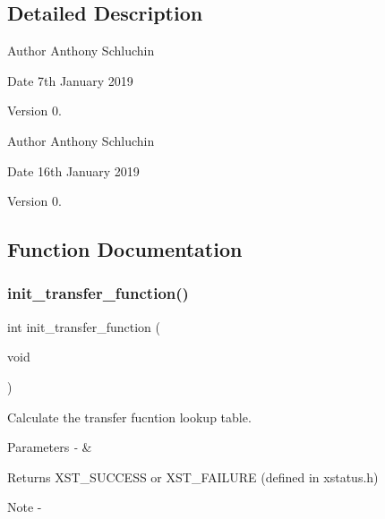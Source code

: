\subsection{Detailed Description}
\begin{DoxyAuthor}{Author}
Anthony Schluchin 
\end{DoxyAuthor}
\begin{DoxyDate}{Date}
7th January 2019 
\end{DoxyDate}
\begin{DoxyVersion}{Version}
0.
\end{DoxyVersion}
\begin{DoxyAuthor}{Author}
Anthony Schluchin 
\end{DoxyAuthor}
\begin{DoxyDate}{Date}
16th January 2019 
\end{DoxyDate}
\begin{DoxyVersion}{Version}
0. 
\end{DoxyVersion}


\subsection{Function Documentation}
\mbox{\label{transfer__function_8h_ab0763112842c0400c0bc611fb9b8bca8}} 
\subsubsection{init\_transfer\_function()}
{\footnotesize\ttfamily int init\+\_\+transfer\+\_\+function (\begin{DoxyParamCaption}\item[{void}]{ }\end{DoxyParamCaption})}



Calculate the transfer fucntion lookup table. 


\begin{DoxyParams}{Parameters}
{\em -\/} & \\
\hline
\end{DoxyParams}
\begin{DoxyReturn}{Returns}
X\+S\+T\+\_\+\+S\+U\+C\+C\+E\+SS or X\+S\+T\+\_\+\+F\+A\+I\+L\+U\+RE (defined in xstatus.\+h)
\end{DoxyReturn}
\begin{DoxyNote}{Note}
-\/ 
\end{DoxyNote}
